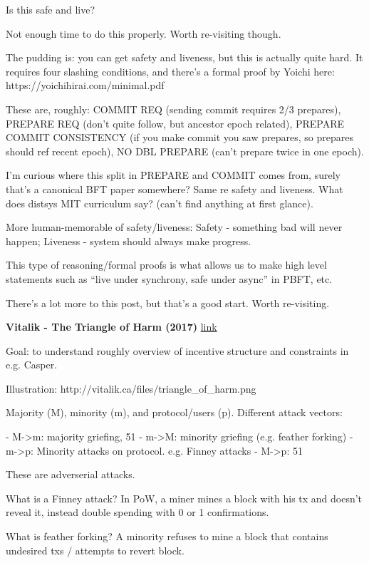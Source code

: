 \documentclass[12pt]{report}
\newcommand{\link}[2]{\href{#1}{#2}}
\begin{document}
Is this safe and live?

Not enough time to do this properly. Worth re-visiting though.

The pudding is: you can get safety and liveness, but this is actually quite
hard. It requires four slashing conditions, and there's a formal proof by Yoichi
here: https://yoichihirai.com/minimal.pdf

These are, roughly: COMMIT REQ (sending commit requires 2/3 prepares), PREPARE
REQ (don't quite follow, but ancestor epoch related), PREPARE COMMIT CONSISTENCY
(if you make commit you saw prepares, so prepares should ref recent epoch), NO
DBL PREPARE (can't prepare twice in one epoch).

I'm curious where this split in PREPARE and COMMIT comes from, surely that's a
canonical BFT paper somewhere? Same re safety and liveness. What does distsys
MIT curriculum say? (can't find anything at first glance).

More human-memorable of safety/liveness: Safety - something bad will never
happen; Liveness - system should always make progress.

This type of reasoning/formal proofs is what allows us to make high level
statements such as ``live under synchrony, safe under async'' in PBFT, etc.

There's a lot more to this post, but that's a good start. Worth re-visiting.

\textbf{Vitalik - The Triangle of Harm (2017)}
\link{https://vitalik.ca/general/2017/07/16/triangle_of_harm.html}{link}

Goal: to understand roughly overview of incentive structure and constraints in
e.g. Casper.

Illustration: http://vitalik.ca/files/triangle_of_harm.png

Majority (M), minority (m), and protocol/users (p). Different attack vectors:

- M->m: majority griefing, 51%
- m->M: minority griefing (e.g. feather forking)
- m->p: Minority attacks on protocol. e.g. Finney attacks
- M->p: 51%

These are adverserial attacks.

What is a Finney attack?
In PoW, a miner mines a block with his tx and doesn't reveal it, instead double
spending with 0 or 1 confirmations.

What is feather forking?
A minority refuses to mine a block that contains undesired txs / attempts to
revert block.
\end{document}
